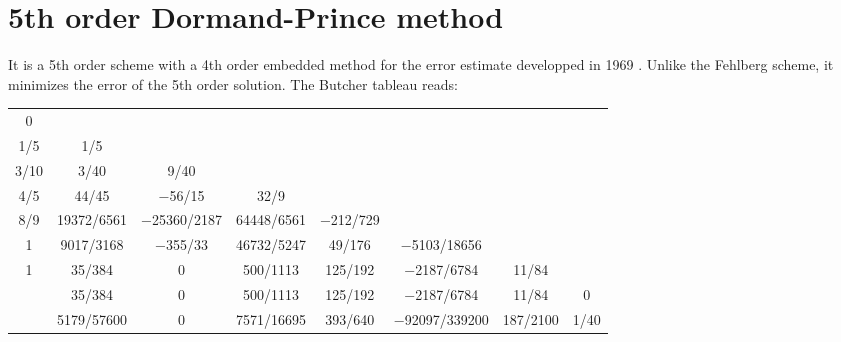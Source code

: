 \section{5th order Dormand-Prince method}
It is a 5th order scheme with a 4th order embedded method for the error estimate developped in 1969 \cite{RK-DormandPrince}. Unlike the Fehlberg scheme, it minimizes the error of the 5th order solution. The Butcher tableau reads:

\begin{center}
	\begin{tabular}{c | c c c c c c c}
		0 & & & & & & & \\
		1/5 & 1/5 & & & & & & \\
		3/10 & 3/40 & 9/40 & & & & & \\
		4/5 & 44/45 & −56/15 & 32/9 & & & & \\
		8/9 & 19372/6561 & −25360/2187 & 64448/6561 & −212/729 & & & \\
		1 & 9017/3168 & −355/33 & 46732/5247 & 49/176 & −5103/18656 & & \\
		1 & 35/384 & 0 & 500/1113 & 125/192 & −2187/6784 & 11/84 & \\ \hline	
		& 35/384 & 0 & 500/1113 & 125/192 & −2187/6784 & 11/84 & 0 \\
		& 5179/57600 & 0 & 7571/16695 & 393/640 & −92097/339200 & 187/2100 & 1/40 
	\end{tabular}
\end{center}


